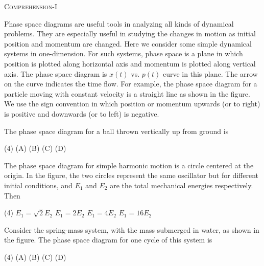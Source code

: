 \begin{center}
    \textsc{Comprehension-I}
\end{center}

Phase space diagrams are useful tools in analyzing all kinds of dynamical problems. They are especially useful in studying the changes in motion as initial position and momentum are changed. Here we consider some simple dynamical systems in one-dimension. For such systems, phase space is a plane in which position is plotted along horizontal axis and momentum is plotted along vertical axis. The phase space diagram is $x(t)$ vs. $p(t)$ curve in this plane. The arrow on the curve indicates the time flow. For example, the phase space diagram for a particle moving with constant velocity is a straight line as shown in the figure. We use the sign convention in which position or momentum upwards (or to right) is positive and downwards (or to left) is negative.

\begin{center}
\end{center} 

\item The phase space diagram for a ball thrown vertically up from ground is
    \begin{tasks}(4)
        \task (A)
        \task (B)
        \task (C)
        \task (D)
    \end{tasks}

\item The phase space diagram for simple harmonic motion is a circle centered at the origin. In the figure, the two circles represent the same oscillator but for different initial conditions, and \( E_1 \) and \( E_2 \) are the total mechanical energies respectively. Then
    \begin{tasks}(4)
        \task \( E_1 = \sqrt{2} E_2 \)
        \task \( E_1 = 2 E_2 \)
        \task \( E_1 = 4 E_2 \)
        \task \( E_1 = 16 E_2 \)
    \end{tasks}

\item Consider the spring-mass system, with the mass submerged in water, as shown in the figure. The phase space diagram for one cycle of this system is
    \begin{tasks}(4)
        \task (A)
        \task (B)
        \task (C)
        \task (D)
    \end{tasks}